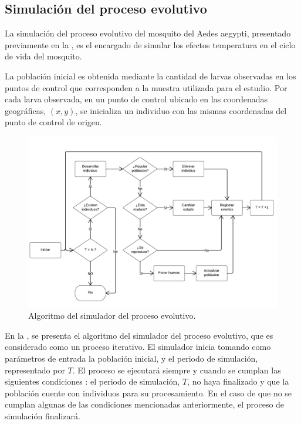 \subsection{Simulación del proceso evolutivo}
La simulación del proceso evolutivo del mosquito del Aedes aegypti, presentado previamente en la
, es el encargado de simular los efectos temperatura
en el ciclo de vida del mosquito.

La población inicial es obtenida mediante la cantidad de larvas observadas en los puntos de
control que corresponden a la muestra utilizada para el estudio. Por cada larva observada,
en un punto de control ubicado en las coordenadas geográficas, $(x, y)$, se inicializa un individuo
con las mismas coordenadas del punto de control de origen.

\begin{figure}[!htpb]
\centering
\includegraphics[width=1\textwidth]{capitulo-5/graphics/algoritmo-evolutivo.png}
\caption{\label{fig:cap-5-alg-evolutivo} Algoritmo del simulador del proceso evolutivo.}
\end{figure}

En la , se presenta el algoritmo del simulador del proceso
evolutivo, que es considerado como un proceso iterativo. El simulador inicia tomando como
parámetros de entrada la población inicial, y el periodo de simulación, representado por $T$. El
proceso se ejecutará siempre y cuando se cumplan las siguientes condiciones : el periodo de
simulación, $T$, no haya finalizado y que la población cuente con individuos para su procesamiento.
En el caso de que no se cumplan algunas de las condiciones mencionadas anteriormente, el proceso
de simulación finalizará.

